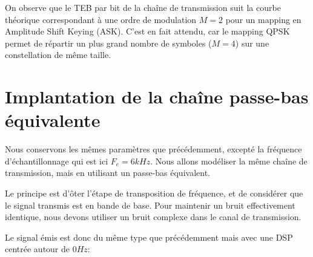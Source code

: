 \documentclass[a4paper, 12pt]{article}
\begin{document}
On observe que le TEB par bit de la chaîne de transmission suit la courbe
théorique correspondant à une ordre de modulation $M = 2$ pour un mapping en
Amplitude Shift Keying (ASK). C'est en fait attendu, car le mapping QPSK permet
de répartir un plus grand nombre de symboles ($M = 4$) sur une constellation de
même taille. \medbreak

\clearpage
\section{Implantation de la chaîne passe-bas équivalente}

Nous conservons les mêmes paramètres que précédemment, excepté la fréquence
d'échantillonnage qui est ici $F_e = 6kHz$. Nous allons modéliser la même chaîne
de transmission, mais en utilisant un passe-bas équivalent. \medbreak

Le principe est d'ôter l'étape de transposition de fréquence, et de considérer
que le signal transmis est en bande de base. Pour maintenir un bruit
effectivement identique, nous devons utiliser un bruit complexe dans le canal de
transmission. \medbreak

Le signal émis est donc du même type que précédemment mais avec une DSP centrée
autour de $0Hz$:


\begin{figure}[H]
\begin{adjustbox}{center}
\hspace{-2em}
\end{adjustbox}
\end{figure}
\end{document}
